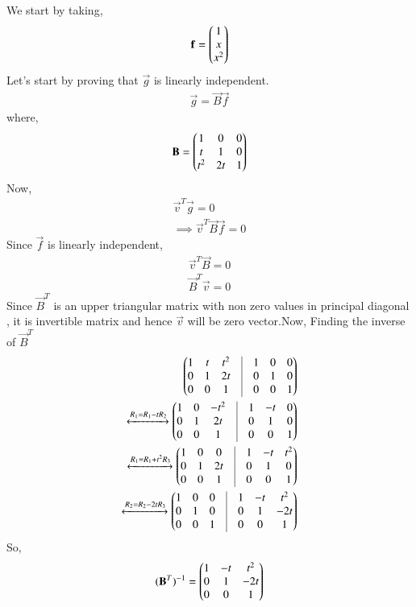    We start by taking,\begin{align}\mathbf{f}=\begin{pmatrix}1\\x\\x^2\end{pmatrix}\end{align}
   Let's start by proving that $\vec{g}$ is linearly independent.
    \begin{align}
    \vec{g}=\vec{B}\vec{f}
    \end{align}
    where,
    \begin{align}
    \mathbf{B}=\begin{pmatrix}1&0&0\\t&1&0\\t^2&2t&1\end{pmatrix}
    \end{align}
    Now,
    \begin{align}
    \vec{v}^T\vec{g}=0\\
    \implies \vec{v}^T\vec{B}\vec{f}=0
    \end{align}
    Since $\vec{f}$ is linearly independent,
    \begin{align}
     \vec{v}^T\vec{B}=0\\
     \vec{B}^T\vec{v}=0
    \end{align}
   Since $\vec{B}^T$ is an upper triangular matrix with non zero values in principal diagonal  , it is invertible matrix and hence $\vec{v}$ will be zero vector.Now, Finding the inverse of $\vec{B}^T$
   \begin{align}
   \myvec{1&t&t^2&\vrule&1&0&0\\0&1&2t&\vrule&0&1&0\\0&0&1&\vrule&0&0&1}\\
  \xleftrightarrow{R_1=R_1-tR_2} \myvec{1&0&-t^2&\vrule&1&-t&0\\0&1&2t&\vrule&0&1&0\\0&0&1&\vrule&0&0&1}\\
 \xleftrightarrow{R_1=R_1+t^2R_3}  \myvec{1&0&0&\vrule&1&-t&t^2\\0&1&2t&\vrule&0&1&0\\0&0&1&\vrule&0&0&1}\\
   \xleftrightarrow{R_2=R_2-2tR_3} \myvec{1&0&0&\vrule&1&-t&t^2\\0&1&0&\vrule&0&1&-2t\\0&0&1&\vrule&0&0&1}
   \end{align}
   So, 
   \begin{align}
   (\mathbf{B}^{T})^{-1}=\begin{pmatrix}1&-t&t^2\\0&1&-2t\\0&0&1\end{pmatrix}\label{eq:solutions/2/4/7/inverse}
   \end{align}
